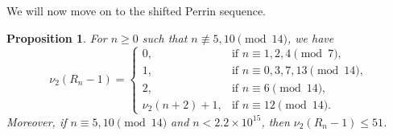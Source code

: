 \documentclass[11pt,a4paper]{article}
\newtheorem{proposition}[theorem]{Proposition}
\numberwithin{equation}{section}
\numberwithin{table}{section}
\numberwithin{figure}{section}
\begin{document}
We will now move on to the shifted Perrin sequence.

\begin{proposition}\label{prop:Rn}
	For $n\ge 0$ such that $n\not\equiv 5,10\pmod{14}$, we have
	\begin{equation*}
		\nu_{2}(R_{n}-1)= 
		\begin{cases}
			0, & \text{if } n\equiv 1,2,4\pmod{7},\\
			1, & \text{if } n\equiv 0,3,7,13\pmod{14},\\
			2, & \text{if } n\equiv 6\pmod{14},\\
			\nu_{2}(n+2)+1, & \text{if } n\equiv 12\pmod{14}.
		\end{cases}
	\end{equation*}
	Moreover, if $n\equiv 5,10\pmod{14}$ and 
	$n<2.2\times 10^{15}$, then $\nu_{2}(R_{n}-1)\le 51$.
\end{proposition}
\end{document}
